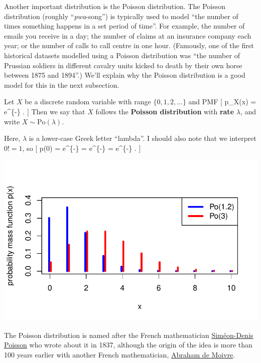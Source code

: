 \documentclass[
  letterpaper,
]{report}
\theoremstyle{definition}
\theoremstyle{definition}
\theoremstyle{remark}
\begin{document}
Another important distribution is the Poisson distribution. The Poisson
distribution (roughly ``\emph{pwa}-song'') is typically used to model
``the number of times something happens in a set period of time''. For
example, the number of emails you receive in a day; the number of claims
at an insurance company each year; or the number of calls to call centre
in one hour. (Famously, one of the first historical datasets modelled
using a Poisson distribution was ``the number of Prussian soldiers in
different cavalry units kicked to death by their own horse between 1875
and 1894''.) We'll explain why the Poisson distribution is a good model
for this in the next subsection.

Let \(X\) be a discrete random variable with range \(\{0,1,2,\dots\}\)
and PMF {[} p\_X(x) = \mathrm e\^{}\{-\lambda\}  .
{]} Then we say that \(X\) follows the \textbf{Poisson distribution}
with \textbf{rate} \(\lambda\), and write \(X \sim \text{Po}(\lambda)\).

Here, \(\lambda\) is a lower-case Greek letter ``lambda''. I should also
note that we interpret \(0! = 1\), so {[} p(0) =
\mathrm e\^{}\{-\lambda\}  =
\mathrm e\^{}\{-\lambda\}  = \mathrm e\^{}\{-\lambda\} . {]}

\includegraphics{sections/L12-poisson_files/figure-pdf/po-pic-1.pdf}

The Poisson distribution is named after the French mathematician
\href{https://mathshistory.st-andrews.ac.uk/Biographies/Poisson/}{Siméon-Denis
Poisson} who wrote about it in 1837, although the origin of the idea is
more than 100 years earlier with another French mathematician,
\href{https://mathshistory.st-andrews.ac.uk/Biographies/De_Moivre/}{Abraham
de Moivre}.
\end{document}
